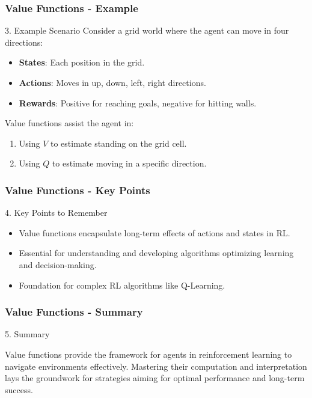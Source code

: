 \documentclass[aspectratio=169]{beamer}
\begin{document}
\begin{frame}[fragile]
    \frametitle{Value Functions - Example}
    
    \begin{block}{3. Example Scenario}
        Consider a grid world where the agent can move in four directions:
    \end{block}
    \begin{itemize}
        \item {\bf States}: Each position in the grid.
        \item {\bf Actions}: Moves in up, down, left, right directions.
        \item {\bf Rewards}: Positive for reaching goals, negative for hitting walls.
    \end{itemize}
    
    Value functions assist the agent in:
    \begin{enumerate}
        \item Using \( V \) to estimate standing on the grid cell.
        \item Using \( Q \) to estimate moving in a specific direction.
    \end{enumerate}
\end{frame}

\begin{frame}[fragile]
    \frametitle{Value Functions - Key Points}
    
    \begin{block}{4. Key Points to Remember}
    \end{block}
    \begin{itemize}
        \item Value functions encapsulate long-term effects of actions and states in RL.
        \item Essential for understanding and developing algorithms optimizing learning and decision-making.
        \item Foundation for complex RL algorithms like Q-Learning.
    \end{itemize}
\end{frame}

\begin{frame}[fragile]
    \frametitle{Value Functions - Summary}
    
    \begin{block}{5. Summary}
    \end{block}
    
    Value functions provide the framework for agents in reinforcement learning to navigate environments effectively. Mastering their computation and interpretation lays the groundwork for strategies aiming for optimal performance and long-term success.
\end{frame}
\end{document}
